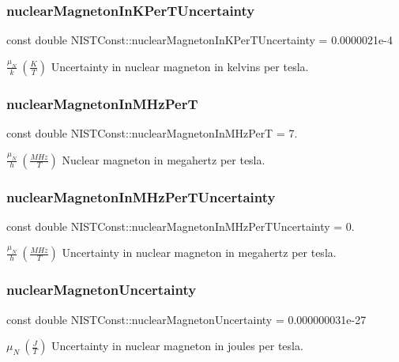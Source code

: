 \subsubsection{\texorpdfstring{nuclear\+Magneton\+In\+K\+Per\+T\+Uncertainty}{nuclearMagnetonInKPerTUncertainty}}
{\footnotesize\ttfamily const double N\+I\+S\+T\+Const\+::nuclear\+Magneton\+In\+K\+Per\+T\+Uncertainty = 0.\+0000021e-\/4}

$\frac{\mu_N}{k} \ (\frac{K}{T})$ Uncertainty in nuclear magneton in kelvins per tesla. \mbox{\label{group___nuclear_magneton_gae1ed12acbc3f50345ed451327b86b5b5}} 
\subsubsection{\texorpdfstring{nuclear\+Magneton\+In\+M\+Hz\+PerT}{nuclearMagnetonInMHzPerT}}
{\footnotesize\ttfamily const double N\+I\+S\+T\+Const\+::nuclear\+Magneton\+In\+M\+Hz\+PerT = 7.}

$\frac{\mu_N}{h} \ (\frac{MHz}{T})$ Nuclear magneton in megahertz per tesla. \mbox{\label{group___nuclear_magneton_gafadaf7c2f76a76acf9313700c176b0a2}} 
\subsubsection{\texorpdfstring{nuclear\+Magneton\+In\+M\+Hz\+Per\+T\+Uncertainty}{nuclearMagnetonInMHzPerTUncertainty}}
{\footnotesize\ttfamily const double N\+I\+S\+T\+Const\+::nuclear\+Magneton\+In\+M\+Hz\+Per\+T\+Uncertainty = 0.}

$\frac{\mu_N}{h} \ (\frac{MHz}{T})$ Uncertainty in nuclear magneton in megahertz per tesla. \mbox{\label{group___nuclear_magneton_ga1f693f4e6c1d8f771594a847e185b072}} 
\subsubsection{\texorpdfstring{nuclear\+Magneton\+Uncertainty}{nuclearMagnetonUncertainty}}
{\footnotesize\ttfamily const double N\+I\+S\+T\+Const\+::nuclear\+Magneton\+Uncertainty = 0.\+000000031e-\/27}

$\mu_N \ (\frac{J}{T})$ Uncertainty in nuclear magneton in joules per tesla. 
